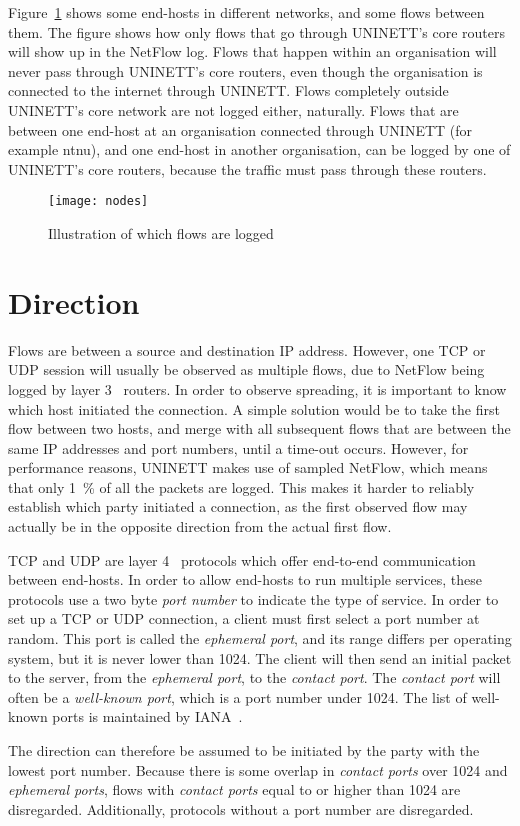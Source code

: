 Figure~\ref{fig:nodes} shows some end-hosts in different networks, and some flows between them.
The figure shows how only flows that go through UNINETT's core routers will show up in the NetFlow log.
Flows that happen within an organisation will never pass through UNINETT's core routers, even though the organisation is connected to the internet through UNINETT.
Flows completely outside UNINETT's core network are not logged either, naturally.
Flows that are between one end-host at an organisation connected through UNINETT (for example \gls{ntnu}), and one end-host in another organisation, can be logged by one of UNINETT's core routers, because the traffic must pass through these routers.

\begin{figure}[h!]
	\caption{Illustration of which flows are logged}
	\label{fig:nodes}
	\centering
		\texttt{[image: nodes]}
\end{figure}


\section{Direction}
\label{sec:direction}

Flows are between a source and destination IP address.
However, one TCP or UDP session will usually be observed as multiple flows,
 due to NetFlow being logged by layer 3~\cite{zimmermann1980osi} routers.
In order to observe spreading, it is important to know which host initiated the connection.
A simple solution would be to take the first flow between two hosts, and merge with all subsequent flows that are between the same IP addresses and port numbers,
 until a time-out occurs.
However, for performance reasons, UNINETT makes use of sampled NetFlow, which means that only 1~\% of all the packets are logged.
This makes it harder to reliably establish which party initiated a connection,
 as the first observed flow may actually be in the opposite direction from the actual first flow.

TCP and UDP are layer 4~\cite{zimmermann1980osi} protocols which offer end-to-end communication between end-hosts.
In order to allow end-hosts to run multiple services, these protocols use a two byte \emph{port number} to indicate the type of service.
In order to set up a TCP or UDP connection, a client must first select a port number at random.
This port is called the \emph{\gls{ephemeral port}}, and its range differs per operating system, but it is never lower than 1024.
The client will then send an initial packet to the server, from the \emph{\gls{ephemeral port}}, to the \emph{\gls{contact port}}.
The \emph{\gls{contact port}} will often be a \emph{\gls{well-known port}}, which is a port number under 1024.
The list of \gls{well-known port}s is maintained by IANA~\cite{rfc1700}.

The direction can therefore be assumed to be initiated by the party with the lowest port number.
Because there is some overlap in \emph{\gls{contact port}s} over 1024 and \emph{\gls{ephemeral port}s},
 flows with \emph{\gls{contact port}s} equal to or higher than 1024 are disregarded.
Additionally, protocols without a port number are disregarded.

